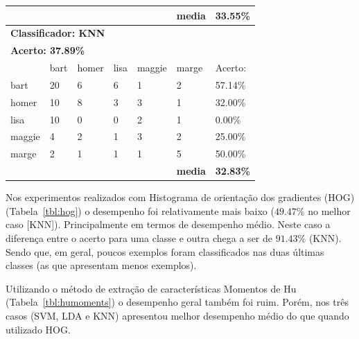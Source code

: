 \documentclass[journal]{IEEEtran}
\begin{document}
\begin{table}[!htb]
\begin{tabular}{l|l|l|l|l|l|l}
\textbf{} & \textbf{} & \textbf{} & \textbf{} & \textbf{} & \textbf{media} & \textbf{33.55\%} \\ \hline
\multicolumn{7}{l}{\textbf{Classificador: KNN}}                                                \\ \hline
\multicolumn{7}{l}{\textbf{Acerto: 37.89\%}}                                                  \\ \hline
          & bart      & homer     & lisa      & maggie    & marge          & Acerto:            \\ \hline
bart      & 20        & 6         & 6         & 1         & 2              & 57.14\%          \\ \hline
homer     & 10        & 8         & 3         & 3         & 1              & 32.00\%          \\ \hline
lisa      & 10        & 0         & 0         & 2         & 1              & 0.00\%           \\ \hline
maggie    & 4         & 2         & 1         & 3         & 2              & 25.00\%          \\ \hline
marge     & 2         & 1         & 1         & 1         & 5              & 50.00\%          \\ \hline
\textbf{} & \textbf{} & \textbf{} & \textbf{} & \textbf{} & \textbf{media} & \textbf{32.83\%} \\ \hline
\end{tabular}
\end{table}

Nos experimentos realizados com Histograma de orientação dos gradientes (HOG) (Tabela~\ref{tbl:hog}) o desempenho foi relativamente mais baixo ($49.47\%$ no melhor caso [KNN]).
Principalmente em termos de desempenho médio. 
Neste caso a diferença entre o acerto para uma classe e outra chega a ser de $91.43\%$ (KNN).
Sendo que, em geral, poucos exemplos foram classificados nas duas últimas classes (as que apresentam menos exemplos).

Utilizando o método de extração de características Momentos de Hu (Tabela~\ref{tbl:humoments}) o desempenho geral também foi ruim.
Porém, nos três casos (SVM, LDA e KNN) apresentou melhor desempenho médio do que quando utilizado HOG.
\end{document}
